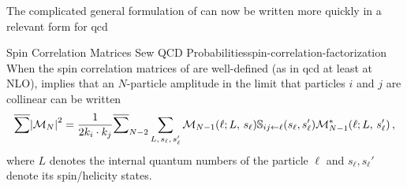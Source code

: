 The complicated general formulation of  can now be written more quickly in a relevant form for \gls{qcd}
\begin{lemma}{Spin Correlation Matrices Sew QCD Probabilities}{spin-correlation-factorization}
    When the spin correlation matrices of  are well-defined (as in \gls{qcd} at least at NLO),  implies that an \(N\)-particle amplitude in the limit that particles \(i\) and \(j\) are collinear can be written
    \begin{align}
        \overline{\sum} \abs{\mathcal{M}_N}^2
        =
        \frac{1}{2 k_i\cdot k_j}
        \overline{\sum}_{N-2}
        \sum_{L,\,s_\ell,\,s_\ell'}
        \mathcal{M}_{N-1}(\ell; L,\,s_\ell)
        \mathbb{S}_{ij \leftarrow \ell}(s_\ell, s_\ell')
        \mathcal{M}^*_{N-1}(\ell; L,\,s_\ell')
        \,,
    \end{align}
    where \(L\) denotes the internal quantum numbers of the particle \(\ell\) and \(s_\ell, s_\ell'\) denote its spin/helicity states.
\end{lemma}



